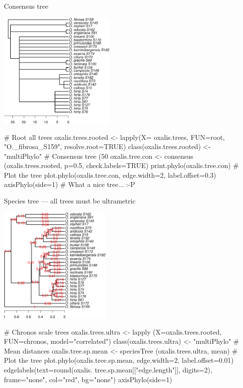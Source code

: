 \documentclass[compress, ucs, xelatex, 11pt, xcolor=svgnames,
	hyperref={
		bookmarks=true,
		unicode=true,
		colorlinks=true,
		pdftitle={Molecular data in R},
		plainpages=false,
		pdfauthor={Vojtech Zeisek},
		pdfsubject={Course about phylogeny and evolution in R},
		pdfcreator={XeLaTeX},
		pdfkeywords={R, evolution, phylogeny, molecular data},
		linkcolor=Tomato,
		anchorcolor=SaddleBrown,
		citecolor=Goldenrod,
		filecolor=DarkMagenta,
		menucolor=Sienna,
		urlcolor=DarkTurquoise,
		pdftex},
	url={hyphens, lowtilde} %
	]{beamer}
\begin{document}
\begin{frame}[fragile]{Consensus tree}
	\begin{multicols}{2}
		\begin{center}
			\includegraphics[height=5.75cm]{oxalis-cons.png}
		\end{center}
		\begin{spluscode}
    # Root all trees
    oxalis.trees.rooted <-
      lapply(X= oxalis.trees,
      FUN=root, "O._fibrosa_S159",
      resolve.root=TRUE)
    class(oxalis.trees.rooted) <-
      "multiPhylo"
    # Consensus tree (50 %
    oxalis.tree.con <- consensus
      (oxalis.trees.rooted, p=0.5,
      check.labels=TRUE)
    print.phylo(oxalis.tree.con)
    # Plot the tree
    plot.phylo(oxalis.tree.con,
      edge.width=2, label.offset=0.3)
    axisPhylo(side=1)
    # What a nice tree... :-P
		\end{spluscode}
	\end{multicols}
\end{frame}

\begin{frame}[fragile]{Species tree --- all trees must be ultrametric}
	\begin{multicols}{2}
		\begin{center}
			\includegraphics[height=5.75cm]{oxalis-sp.png}
		\end{center}
		\begin{spluscode}
    # Chronos scale trees
    oxalis.trees.ultra <- lapply
      (X=oxalis.trees.rooted,
      FUN=chronos, model="correlated")
    class(oxalis.trees.ultra) <-
      "multiPhylo"
    # Mean distances
    oxalis.tree.sp.mean <- speciesTree
      (oxalis.trees.ultra, mean)
    # Plot the tree
    plot.phylo(oxalis.tree.sp.mean,
      edge.width=2, label.offset=0.01)
    edgelabels(text=round(oxalis.
      tree.sp.mean[["edge.length"]],
      digits=2), frame="none",
      col="red", bg="none")
    axisPhylo(side=1)
		\end{spluscode}
	\end{multicols}
	\end{frame}
\end{document}
